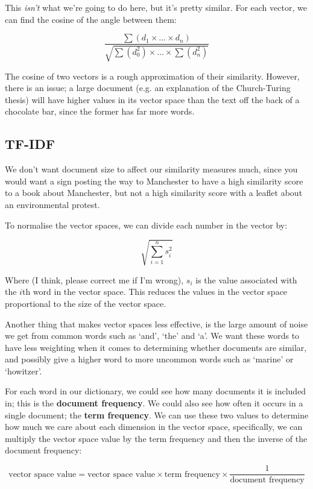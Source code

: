 This \textit{isn't} what we're going to do here, but it's pretty similar. For
each vector, we can find the cosine of the angle between them:

\[
  \frac{\sum (d_1 \times \dots \times d_n)}
       {\sqrt{\sum (d_0^2) \times \dots \times \sum (d_n^2)}}
\]

The cosine of two vectors is a rough approximation of their similarity. However,
there is an issue; a large document (e.g. an explanation of the Church-Turing
thesis) will have higher values in its vector space than the text off the back
of a chocolate bar, since the former has far more words.

\subsection{TF-IDF}

We don't want document size to affect our similarity measures much, since you
would want a sign posting the way to Manchester to have a high similarity score
to a book about Manchester, but not a high similarity score with a leaflet about
an environmental protest. 

To normalise the vector spaces, we can divide each number in the vector by:

\[
  \sqrt{\sum_{i=1}^ns_i^2}
\]

Where (I think, please correct me if I'm wrong), $s_i$ is the value associated
with the $i$th word in the vector space. This reduces the values in the vector
space proportional to the size of the vector space.

Another thing that makes vector spaces less effective, is the large amount of
noise we get from common words such as `and', `the' and `a'. We want these words
to have less weighting when it comes to determining whether documents are
similar, and possibly give a higher word to more uncommon words such as `marine'
or `howitzer'.

For each word in our dictionary, we could see how many documents it is included
in; this is the \textbf{document frequency}. We could also see how often it
occurs in a single document; the \textbf{term frequency}. We can use these two
values to determine how much we care about each dimension in the vector space,
specifically, we can multiply the vector space value by the term frequency and
then the inverse of the document frequency:

\[
  \text{vector space value} =
    \text{vector space value} \times
    \text{term frequency} \times
    \frac{1}{\text{document frequency}}
\]

